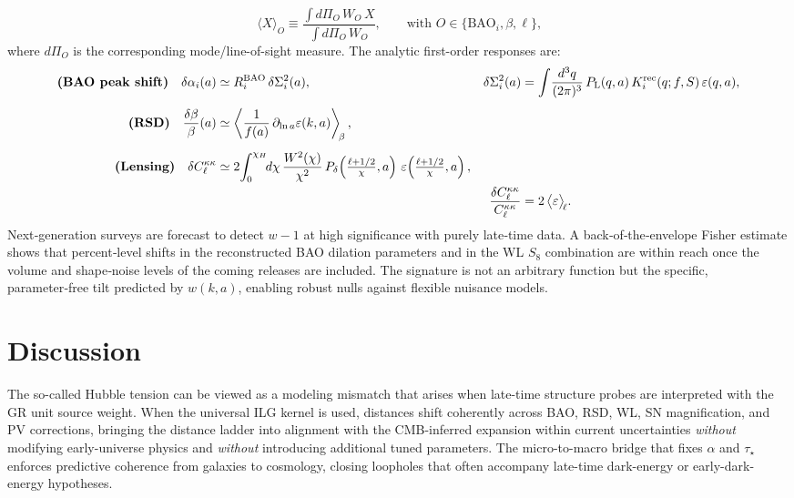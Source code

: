 \documentclass[11pt]{article}
\begin{document}
\begin{equation}
\big\langle X\big\rangle_{O}\equiv
\frac{\displaystyle \int d\Pi_O\,W_O\,X}{\displaystyle \int d\Pi_O\,W_O},
\qquad \text{with $O\in\{\mathrm{BAO}_i,\beta,\ell\}$,}
\end{equation}
where $d\Pi_O$ is the corresponding mode/line-of-sight measure. The analytic first-order responses are:
\begin{align}
\textbf{(BAO peak shift)}\quad
\delta\alpha_i(a)
&\simeq R^{\rm BAO}_i\,\delta\Sigma_i^2(a),
&
\delta\Sigma_{i}^2(a)
&=\int\!\frac{d^3q}{(2\pi)^3}\,P_{\rm L}(q,a)\,K^{\rm rec}_{i}(q;f,S)\,\varepsilon(q,a),
\label{eq:blocker-bao}\\[4pt]
\textbf{(RSD)}\quad
\frac{\delta\beta}{\beta}(a)
&\simeq \left\langle\frac{1}{f(a)}\,\partial_{\ln a}\varepsilon(k,a)\right\rangle_{\!\beta},
\label{eq:blocker-beta}\\[4pt]
\textbf{(Lensing)}\quad
\delta C_{\ell}^{\kappa\kappa}
&\simeq 2\!\int_0^{\chi_H}\!\!d\chi\,\frac{W^2(\chi)}{\chi^2}\,
P_{\delta}\!\left(\tfrac{\ell+1/2}{\chi},a\right)\,
\varepsilon\!\left(\tfrac{\ell+1/2}{\chi},a\right),
\notag\\
&& \frac{\delta C_{\ell}^{\kappa\kappa}}{C_{\ell}^{\kappa\kappa}}
&= 2\,\big\langle\varepsilon\big\rangle_{\!\ell}.
\label{eq:blocker-cl}
\end{align}
Next‑generation surveys are forecast to detect $w-1$ at high significance with purely late‑time data. A back‑of‑the‑envelope Fisher estimate shows that percent‑level shifts in the reconstructed BAO dilation parameters and in the WL $S_8$ combination are within reach once the volume and shape‑noise levels of the coming releases are included. The signature is not an arbitrary function but the specific, parameter‑free tilt predicted by $w(k,a)$, enabling robust nulls against flexible nuisance models.

\section{Discussion}
The so-called Hubble tension can be viewed as a modeling mismatch that arises when late-time structure probes are interpreted with the GR unit source weight. When the universal ILG kernel is used, distances shift coherently across BAO, RSD, WL, SN magnification, and PV corrections, bringing the distance ladder into alignment with the CMB-inferred expansion within current uncertainties \emph{without} modifying early-universe physics and \emph{without} introducing additional tuned parameters. The micro-to-macro bridge that fixes $\alpha$ and $\tau_\star$ enforces predictive coherence from galaxies to cosmology, closing loopholes that often accompany late-time dark-energy or early-dark-energy hypotheses.
\end{document}
